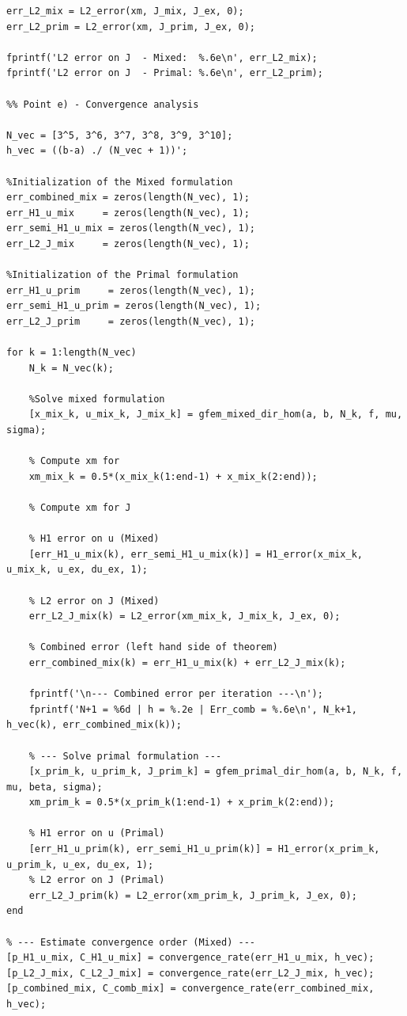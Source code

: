 \documentclass{article}
\begin{document}
\begin{lstlisting}[style=matlab-editor]
%Calculation of the errors L2 of J
err_L2_mix = L2_error(xm, J_mix, J_ex, 0);
err_L2_prim = L2_error(xm, J_prim, J_ex, 0);

fprintf('L2 error on J  - Mixed:  %.6e\n', err_L2_mix);
fprintf('L2 error on J  - Primal: %.6e\n', err_L2_prim);

%% Point e) - Convergence analysis

N_vec = [3^5, 3^6, 3^7, 3^8, 3^9, 3^10];
h_vec = ((b-a) ./ (N_vec + 1))';

%Initialization of the Mixed formulation
err_combined_mix = zeros(length(N_vec), 1);
err_H1_u_mix     = zeros(length(N_vec), 1);
err_semi_H1_u_mix = zeros(length(N_vec), 1);
err_L2_J_mix     = zeros(length(N_vec), 1);

%Initialization of the Primal formulation
err_H1_u_prim     = zeros(length(N_vec), 1);
err_semi_H1_u_prim = zeros(length(N_vec), 1);
err_L2_J_prim     = zeros(length(N_vec), 1);

for k = 1:length(N_vec)
    N_k = N_vec(k);

    %Solve mixed formulation
    [x_mix_k, u_mix_k, J_mix_k] = gfem_mixed_dir_hom(a, b, N_k, f, mu, sigma);
    
    % Compute xm for
    xm_mix_k = 0.5*(x_mix_k(1:end-1) + x_mix_k(2:end));

    % Compute xm for J
  
    % H1 error on u (Mixed)
    [err_H1_u_mix(k), err_semi_H1_u_mix(k)] = H1_error(x_mix_k, u_mix_k, u_ex, du_ex, 1);

    % L2 error on J (Mixed)
    err_L2_J_mix(k) = L2_error(xm_mix_k, J_mix_k, J_ex, 0);

    % Combined error (left hand side of theorem)
    err_combined_mix(k) = err_H1_u_mix(k) + err_L2_J_mix(k);
    
    fprintf('\n--- Combined error per iteration ---\n');
    fprintf('N+1 = %6d | h = %.2e | Err_comb = %.6e\n', N_k+1, h_vec(k), err_combined_mix(k));

    % --- Solve primal formulation ---
    [x_prim_k, u_prim_k, J_prim_k] = gfem_primal_dir_hom(a, b, N_k, f, mu, beta, sigma);
    xm_prim_k = 0.5*(x_prim_k(1:end-1) + x_prim_k(2:end));

    % H1 error on u (Primal)
    [err_H1_u_prim(k), err_semi_H1_u_prim(k)] = H1_error(x_prim_k, u_prim_k, u_ex, du_ex, 1);
    % L2 error on J (Primal)
    err_L2_J_prim(k) = L2_error(xm_prim_k, J_prim_k, J_ex, 0);
end

% --- Estimate convergence order (Mixed) ---
[p_H1_u_mix, C_H1_u_mix] = convergence_rate(err_H1_u_mix, h_vec);
[p_L2_J_mix, C_L2_J_mix] = convergence_rate(err_L2_J_mix, h_vec);
[p_combined_mix, C_comb_mix] = convergence_rate(err_combined_mix, h_vec);


\end{lstlisting}
\end{document}
